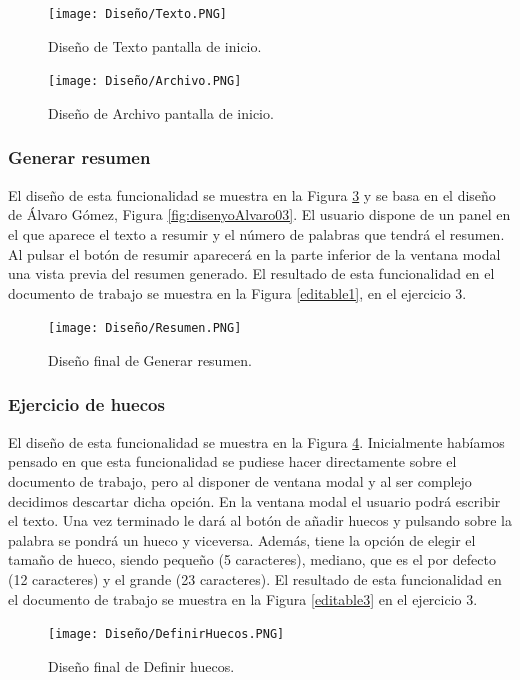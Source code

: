 \begin{figure}[ht!]
  \centering
  \texttt{[image: Diseño/Texto.PNG]}
  \caption{Diseño de Texto pantalla de inicio.}
  \label{texto}
\end{figure}

\begin{figure}[ht!]
  \centering
  \texttt{[image: Diseño/Archivo.PNG]}
  \caption{Diseño de Archivo pantalla de inicio.}
  \label{archivo}
\end{figure}

\subsubsection{Generar resumen}
El diseño de esta funcionalidad se muestra en la Figura \ref{resuemn} y se basa en el diseño de Álvaro Gómez, Figura \ref{fig:disenyoAlvaro03}. El usuario dispone de un panel en el que aparece el texto a resumir y el número de palabras que tendrá el resumen. Al pulsar el botón de resumir aparecerá en la parte inferior de la ventana modal una vista previa del resumen generado. El resultado de esta funcionalidad en el documento de trabajo se muestra en la Figura \ref{editable1}, en el ejercicio 3.

\begin{figure}[ht!]
  \centering
  \texttt{[image: Diseño/Resumen.PNG]}
  \caption{Diseño final de Generar resumen.}
  \label{resuemn}
\end{figure}

\subsubsection{Ejercicio de huecos}
El diseño de esta funcionalidad se muestra en la Figura \ref{definir_hueco}. Inicialmente habíamos pensado en que esta funcionalidad se pudiese hacer directamente sobre el documento de trabajo, pero al disponer de ventana modal y al ser complejo decidimos descartar dicha opción. En la ventana modal el usuario podrá escribir el texto. Una vez terminado le dará al botón de añadir huecos y pulsando sobre la palabra se pondrá un hueco y viceversa. Además, tiene la opción de elegir el tamaño de hueco, siendo pequeño (5 caracteres), mediano, que es el por defecto (12 caracteres) y el grande (23 caracteres). El resultado de esta funcionalidad en el documento de trabajo se muestra en la Figura \ref{editable3} en el ejercicio 3.

\begin{figure}[ht!]
  \centering
  \texttt{[image: Diseño/DefinirHuecos.PNG]}
  \caption{Diseño final de Definir huecos.}
  \label{definir_hueco}
\end{figure}

